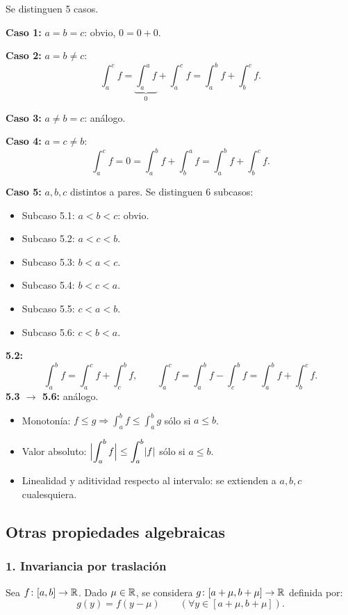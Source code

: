 \documentclass[11pt,a4paper]{article}
\begin{document}
\begin{demo}
Se distinguen 5 casos.

\textbf{Caso 1:} $a=b=c$: obvio, $0=0+0$.

\textbf{Caso 2:} $a=b\ne c$:
\[
  \int_a^c f=\underbrace{\int_a^a f}_{0}+\int_a^c f=\int_a^b f+\int_b^c f.
\]

\textbf{Caso 3:} $a\ne b=c$: análogo.

\textbf{Caso 4:} $a=c\ne b$:
\[
  \int_a^c f=0=\int_a^b f+\int_b^a f=\int_a^b f+\int_b^c f.
\]

\textbf{Caso 5:} $a,b,c$ distintos a pares. Se distinguen 6 subcasos:
\begin{itemize}
  \item Subcaso 5.1: $a<b<c$: obvio.
  \item Subcaso 5.2: $a<c<b$.
  \item Subcaso 5.3: $b<a<c$.
  \item Subcaso 5.4: $b<c<a$.
  \item Subcaso 5.5: $c<a<b$.
  \item Subcaso 5.6: $c<b<a$.
\end{itemize}
\textbf{5.2:}
\[
  \int_a^b f=\int_a^c f+\int_c^b f,
  \qquad
  \int_a^c f=\int_a^b f-\int_c^b f=\int_a^b f+\int_b^c f.
\]
\textbf{5.3 $\to$ 5.6:} análogo.
\end{demo}

\begin{itemize}
  \item Monotonía: $f\le g\Rightarrow\displaystyle\int_a^b f\le\int_a^b g$ \quad sólo si $a\le b$.
  \item Valor absoluto: $\displaystyle\abs[\Big]{\int_a^b f}\le\int_a^b\abs{f}$ \quad sólo si $a\le b$.
  \item Linealidad y aditividad respecto al intervalo: se extienden a $a,b,c$ cualesquiera.
\end{itemize}

\subsection{Otras propiedades algebraicas}

\subsubsection*{1. Invariancia por traslación}

Sea $f\colon[a,b]\to\R$. Dado $\mu\in\R$, se considera $g\colon[a+\mu,b+\mu]\to\R$ definida por:
\[
  g(y)=f(y-\mu)\qquad(\forall y\in[a+\mu,b+\mu]).
\]
\end{document}
